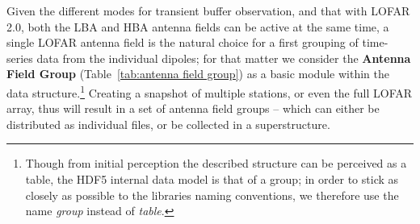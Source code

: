 \documentclass[a4paper,10pt,bibtotoc]{scrartcl}
\begin{document}
Given the different modes for transient buffer observation, and that with LOFAR 2.0, both the LBA and HBA antenna fields can be active at the same time, a single LOFAR
antenna field is the natural choice for a first grouping of time-series
data from the individual dipoles; for that matter we consider the
\textbf{Antenna Field Group} (Table~\ref{tab:antenna field group}) as a basic module within
the data structure.\footnote{Though from initial perception the described
structure can be perceived as a table, the HDF5 internal data model is that
of a group; in order to stick as closely as possible to the libraries naming
conventions, we therefore use the name \textsl{group} instead of \textsl{table}.}
Creating a snapshot of multiple stations, or even the full LOFAR array, thus will
result in a set of antenna field groups -- which can either be distributed as individual files,
 or be collected in a superstructure.
\end{document}
